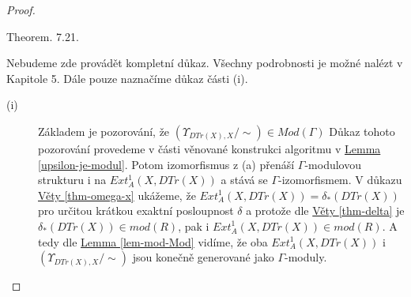      \begin{proof}
       \begin{description}
         \item
         
         \item[(a)] \cite{5} Theorem. 7.21.
           
         \item[(b)] Nebudeme zde provádět kompletní důkaz. Všechny podrobnosti 
         je možné nalézt v \cite{2} Kapitole 5. Dále pouze naznačíme důkaz části (i).
         
         \begin{description}
         \item[(i)]
         Základem je pozorování, že $(\Upsilon_{DTr(X),X}/\sim)\in Mod(\Gamma)$ 
         Důkaz tohoto pozorování provedeme v části věnované konstrukci algoritmu v 
         \hyperref[upsilon-je-modul]{Lemma \ref*{upsilon-je-modul}}. 
         Potom izomorfismus z (a) přenáší $\Gamma$-modulovou strukturu i na
         $Ext_A^1(X,DTr(X))$ a stává se $\Gamma$-izomorfismem.         
         V důkazu \hyperref[thm-omega-x]{Věty \ref*{thm-omega-x}} ukážeme, že
         $Ext_A^1(X,DTr(X))=\delta_*(DTr(X))$ pro určitou krátkou exaktní posloupnost $\delta$
         a protože dle
         \hyperref[thm-delta]{Věty \ref*{thm-delta}} je
         $\delta_*(DTr(X))\in mod(R)$, pak i $Ext_A^1(X,DTr(X))\in mod(R)$.
         A tedy dle \hyperref[lem-mod-Mod]{Lemma \ref*{lem-mod-Mod}} vidíme, že 
         oba $Ext_A^1(X,DTr(X))$ i $(\Upsilon_{DTr(X),X}/\sim)$ jsou konečně generované jako $\Gamma$-moduly.
         \end{description}         
       \end{description}
     \end{proof}
  \clearpage